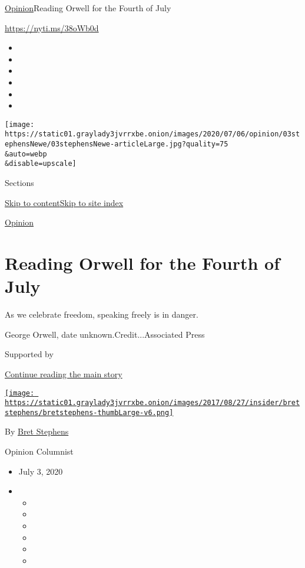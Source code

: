 \href{/section/opinion}{Opinion}\textbar{}Reading Orwell for the Fourth
of July

\url{https://nyti.ms/38oWb0d}

\begin{itemize}
\item
\item
\item
\item
\item
\item
\end{itemize}

\texttt{[image: https://static01.graylady3jvrrxbe.onion/images/2020/07/06/opinion/03stephensNewe/03stephensNewe-articleLarge.jpg?quality=75\\\&auto=webp\\\&disable=upscale]}

Sections

\protect\hyperlink{site-content}{Skip to
content}\protect\hyperlink{site-index}{Skip to site index}

\href{/section/opinion}{Opinion}

\hypertarget{reading-orwell-for-the-fourth-of-july}{%
\section{Reading Orwell for the Fourth of
July}\label{reading-orwell-for-the-fourth-of-july}}

As we celebrate freedom, speaking freely is in danger.

George Orwell, date unknown.Credit...Associated Press

Supported by

\protect\hyperlink{after-sponsor}{Continue reading the main story}

\href{https://www.nytimes3xbfgragh.onion/by/bret-stephens}{\texttt{[image: https://static01.graylady3jvrrxbe.onion/images/2017/08/27/insider/bretstephens/bretstephens-thumbLarge-v6.png]}}

By \href{https://www.nytimes3xbfgragh.onion/by/bret-stephens}{Bret
Stephens}

Opinion Columnist

\begin{itemize}
\item
  July 3, 2020
\item
  \begin{itemize}
  \item
  \item
  \item
  \item
  \item
  \item
  \end{itemize}
\end{itemize}


